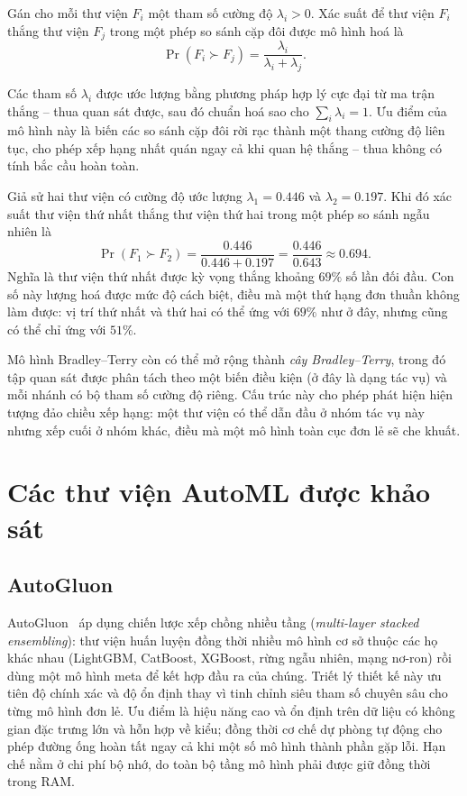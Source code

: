 \begin{dinhnghia}
\label{def:bt}
Gán cho mỗi thư viện $F_i$ một tham số cường độ $\lambda_i > 0$. Xác suất để thư
viện $F_i$ thắng thư viện $F_j$ trong một phép so sánh cặp đôi được mô hình hoá là
\[
    \Pr(F_i \succ F_j) = \frac{\lambda_i}{\lambda_i + \lambda_j}.
\]
\end{dinhnghia}

Các tham số $\lambda_i$ được ước lượng bằng phương pháp hợp lý cực đại từ ma trận
thắng -- thua quan sát được, sau đó chuẩn hoá sao cho $\sum_i \lambda_i = 1$. Ưu
điểm của mô hình này là biến các so sánh cặp đôi rời rạc thành một thang cường độ
liên tục, cho phép xếp hạng nhất quán ngay cả khi quan hệ thắng -- thua không có
tính bắc cầu hoàn toàn.

\begin{vidu}
\label{vd:bt}
Giả sử hai thư viện có cường độ ước lượng $\lambda_1 = 0.446$ và
$\lambda_2 = 0.197$. Khi đó xác suất thư viện thứ nhất thắng thư viện thứ hai
trong một phép so sánh ngẫu nhiên là
\[
    \Pr(F_1 \succ F_2) = \frac{0.446}{0.446 + 0.197} = \frac{0.446}{0.643}
    \approx 0.694.
\]
Nghĩa là thư viện thứ nhất được kỳ vọng thắng khoảng $69\%$ số lần đối đầu. Con số
này lượng hoá được mức độ cách biệt, điều mà một thứ hạng đơn thuần không làm
được: vị trí thứ nhất và thứ hai có thể ứng với $69\%$ như ở đây, nhưng cũng có
thể chỉ ứng với $51\%$.
\end{vidu}

Mô hình Bradley--Terry còn có thể mở rộng thành \emph{cây Bradley--Terry}, trong
đó tập quan sát được phân tách theo một biến điều kiện (ở đây là dạng tác vụ) và
mỗi nhánh có bộ tham số cường độ riêng. Cấu trúc này cho phép phát hiện hiện tượng
đảo chiều xếp hạng: một thư viện có thể dẫn đầu ở nhóm tác vụ này nhưng xếp cuối ở
nhóm khác, điều mà một mô hình toàn cục đơn lẻ sẽ che khuất.

\section{Các thư viện AutoML được khảo sát}
\label{sec:frameworks}
\subsection{AutoGluon}
AutoGluon~\cite{erickson2020autogluon} áp dụng chiến lược xếp chồng nhiều tầng
(\textit{multi-layer stacked ensembling}): thư viện huấn luyện đồng thời nhiều mô
hình cơ sở thuộc các họ khác nhau (LightGBM, CatBoost, XGBoost, rừng ngẫu nhiên,
mạng nơ-ron) rồi dùng một mô hình meta để kết hợp đầu ra của chúng. Triết lý thiết
kế này ưu tiên độ chính xác và độ ổn định thay vì tinh chỉnh siêu tham số chuyên
sâu cho từng mô hình đơn lẻ. Ưu điểm là hiệu năng cao và ổn định trên dữ liệu có
không gian đặc trưng lớn và hỗn hợp về kiểu; đồng thời cơ chế dự phòng tự động cho
phép đường ống hoàn tất ngay cả khi một số mô hình thành phần gặp lỗi. Hạn chế
nằm ở chi phí bộ nhớ, do toàn bộ tầng mô hình phải được giữ đồng thời trong RAM.

